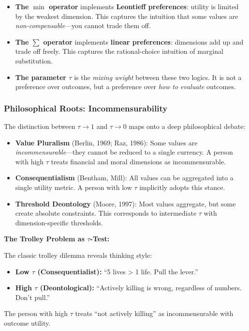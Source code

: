 \begin{itemize}
\item \textbf{The $\min$ operator} implements \textbf{Leontieff preferences}: utility is limited by the weakest dimension. This captures the intuition that some values are \textit{non-compensable}—you cannot trade them off.

\item \textbf{The $\sum$ operator} implements \textbf{linear preferences}: dimensions add up and trade off freely. This captures the rational-choice intuition of marginal substitution.

\item \textbf{The parameter $\tau$} is the \textit{mixing weight} between these two logics. It is not a preference over outcomes, but a preference over \textit{how to evaluate} outcomes.
\end{itemize}

\subsubsection{Philosophical Roots: Incommensurability}

The distinction between $\tau \to 1$ and $\tau \to 0$ maps onto a deep philosophical debate:

\begin{itemize}
\item \textbf{Value Pluralism} (Berlin, 1969; Raz, 1986): Some values are \textit{incommensurable}—they cannot be reduced to a single currency. A person with high $\tau$ treats financial and moral dimensions as incommensurable.

\item \textbf{Consequentialism} (Bentham, Mill): All values can be aggregated into a single utility metric. A person with low $\tau$ implicitly adopts this stance.

\item \textbf{Threshold Deontology} (Moore, 1997): Most values aggregate, but some create absolute constraints. This corresponds to intermediate $\tau$ with dimension-specific thresholds.
\end{itemize}

\begin{intuition}
\textbf{The Trolley Problem as $\tau$-Test:}

The classic trolley dilemma reveals thinking style:
\begin{itemize}
\item \textbf{Low $\tau$ (Consequentialist):} ``5 lives > 1 life. Pull the lever.''
\item \textbf{High $\tau$ (Deontological):} ``Actively killing is wrong, regardless of numbers. Don't pull.''
\end{itemize}

The person with high $\tau$ treats ``not actively killing'' as incommensurable with outcome utility.
\end{intuition}

